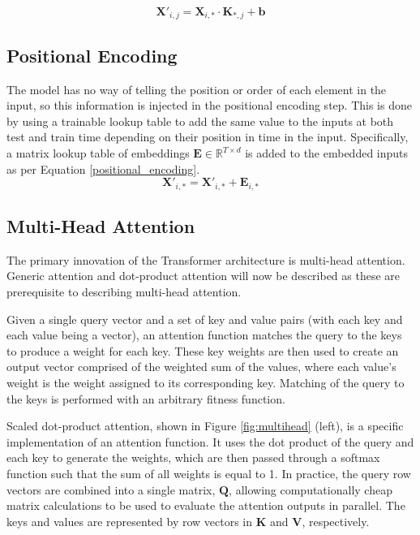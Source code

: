 \documentclass[conference]{IEEEtran}
\begin{document}
\begin{equation} \label{conv_embed}
\boldsymbol{X}'_{i, j} = \boldsymbol{X}_{i,*} \cdot \boldsymbol{K}_{*, j} + \boldsymbol{b}
\end{equation}

\subsection{Positional Encoding}
The model has no way of telling the position or order of each element in the input, so this information is injected in the positional encoding step.
This is done by using a trainable lookup table to add the same value to the inputs at both test and train time depending on their position in time in the input.
Specifically, a matrix lookup table of embeddings $\boldsymbol{E} \in \mathbb{R}^{T \times d}$ is added to the embedded inputs as per Equation \ref{positional_encoding}.
\begin{equation}\label{positional_encoding}
\boldsymbol{X}'_{i,*} = \boldsymbol{X}'_{i,*} + \boldsymbol{E}_{i,*}
\end{equation}

\subsection{Multi-Head Attention} \label{multihead_attention}
The primary innovation of the Transformer architecture is multi-head attention.
Generic attention and dot-product attention will now be described as these are prerequisite to describing multi-head attention.

Given a single query vector and a set of key and value pairs (with each key and each value being a vector), an attention function matches the query to the keys to produce a weight for each key.
These key weights are then used to create an output vector comprised of the weighted sum of the values, where each value's weight is the weight assigned to its corresponding key. 
Matching of the query to the keys is performed with an arbitrary fitness function.

Scaled dot-product attention, shown in Figure \ref{fig:multihead} (left), is a specific implementation of an attention function. 
It uses the dot product of the query and each key to generate the weights, which are then passed through a softmax function such that the sum of all weights is equal to 1.
In practice, the query row vectors are combined into a single matrix, $\boldsymbol{Q}$, allowing computationally cheap matrix calculations to be used to evaluate the attention outputs in parallel.
The keys and values are represented by row vectors in $\boldsymbol{K}$ and $\boldsymbol{V}$, respectively.
\end{document}
